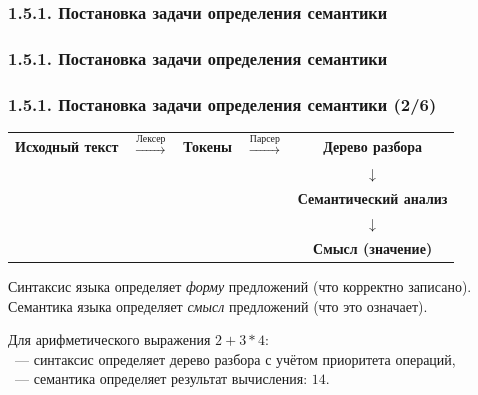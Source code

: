 \subsubsection{1.5.1. Постановка задачи определения семантики}\label{1.5.1.}
\begin{frame}
\frametitle{1.5.1. Постановка задачи определения семантики}

\vspace{5\baselineskip}


\bigskip
{}

\end{frame}


\begin{frame}
\frametitle{1.5.1. Постановка задачи определения семантики (2/6)}


\medskip
\begin{center}
\begin{tabular}{ccccc}
\textbf{Исходный текст} & $\xrightarrow{\text{Лексер}}$ & \textbf{Токены} & 
$\xrightarrow{\text{Парсер}}$ & \textbf{Дерево разбора} \\
& & & & $\downarrow$ \\
& & & & \textbf{Семантический анализ} \\
& & & & $\downarrow$ \\
& & & & \textbf{Смысл (значение)}
\end{tabular}
\end{center}

\begin{remark}
Синтаксис языка определяет \emph{форму} предложений (что корректно записано).\\
Семантика языка определяет \emph{смысл} предложений (что это означает).
\end{remark}

\begin{example}
Для арифметического выражения $2 + 3 * 4$:\\
~--- синтаксис определяет дерево разбора с учётом приоритета операций,\\
~--- семантика определяет результат вычисления: $14$.
\end{example}

\bigskip
{}

\end{frame}



